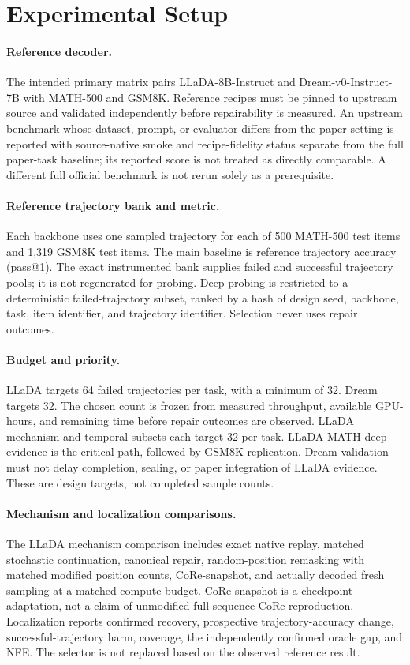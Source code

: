 \section{Experimental Setup}

\paragraph{Reference decoder.}
The intended primary matrix pairs LLaDA-8B-Instruct and Dream-v0-Instruct-7B with
MATH-500 and GSM8K. Reference recipes must be pinned to upstream source and
validated independently before repairability is measured. An upstream benchmark
whose dataset, prompt, or evaluator differs from the paper setting is reported
with source-native smoke and recipe-fidelity status separate from the full
paper-task baseline; its reported score is not treated as directly comparable.
A different full official benchmark is not rerun solely as a prerequisite.

\paragraph{Reference trajectory bank and metric.}
Each backbone uses one sampled trajectory for each of 500 MATH-500 test items and
1,319 GSM8K test items. The main baseline is reference trajectory accuracy
(pass@1). The exact instrumented bank supplies failed and successful trajectory
pools; it is not regenerated for probing. Deep probing is restricted to a
deterministic failed-trajectory subset, ranked by a hash of design seed,
backbone, task, item identifier, and trajectory identifier. Selection never uses
repair outcomes.

\paragraph{Budget and priority.}
LLaDA targets 64 failed trajectories per task, with a minimum of 32. Dream
targets 32. The chosen count is frozen from measured
throughput, available GPU-hours, and remaining time before repair outcomes are
observed. LLaDA mechanism and temporal subsets each target 32 per task. LLaDA MATH deep
evidence is the critical path, followed by GSM8K replication. Dream validation
must not delay completion, sealing, or paper integration of LLaDA evidence.
These are design targets, not completed sample counts.

\paragraph{Mechanism and localization comparisons.}
The LLaDA mechanism comparison includes exact native replay, matched stochastic
continuation, canonical repair, random-position remasking with matched modified
position counts, CoRe-snapshot, and actually decoded fresh sampling at a matched
compute budget. CoRe-snapshot is a checkpoint adaptation, not a claim of
unmodified full-sequence CoRe reproduction. Localization reports confirmed
recovery, prospective trajectory-accuracy change, successful-trajectory harm,
coverage, the independently confirmed oracle gap, and NFE. The selector is not
replaced based on the observed reference result.

